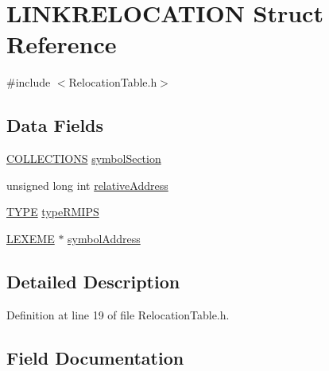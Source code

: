 \hypertarget{struct_l_i_n_k_r_e_l_o_c_a_t_i_o_n}{}\section{L\+I\+N\+K\+R\+E\+L\+O\+C\+A\+T\+I\+ON Struct Reference}
\label{struct_l_i_n_k_r_e_l_o_c_a_t_i_o_n}


{\ttfamily \#include $<$Relocation\+Table.\+h$>$}

\subsection*{Data Fields}
\begin{DoxyCompactItemize}
\item 
\mbox{\hyperlink{_f_s_m_collection_8h_a25f9142504106abec10ec63d2a9be4cd}{C\+O\+L\+L\+E\+C\+T\+I\+O\+NS}} \mbox{\hyperlink{struct_l_i_n_k_r_e_l_o_c_a_t_i_o_n_aa1eeb44bfc2ccae7106913b2bc1d7ccc}{symbol\+Section}}
\item 
unsigned long int \mbox{\hyperlink{struct_l_i_n_k_r_e_l_o_c_a_t_i_o_n_a2b4c998ebe2320c92c078f7e5e389b11}{relative\+Address}}
\item 
\mbox{\hyperlink{_relocation_table_8h_a0bc6723d5d4776ab7cdc646728b775f7}{T\+Y\+PE}} \mbox{\hyperlink{struct_l_i_n_k_r_e_l_o_c_a_t_i_o_n_a7f2b6e2148b75d2d1a211bcdcf45d96f}{type\+R\+M\+I\+PS}}
\item 
\mbox{\hyperlink{struct_l_e_x_e_m_e}{L\+E\+X\+E\+ME}} $\ast$ \mbox{\hyperlink{struct_l_i_n_k_r_e_l_o_c_a_t_i_o_n_aca543ac01363d248142f1a6f76a76023}{symbol\+Address}}
\end{DoxyCompactItemize}


\subsection{Detailed Description}


Definition at line 19 of file Relocation\+Table.\+h.



\subsection{Field Documentation}
\mbox{\label{struct_l_i_n_k_r_e_l_o_c_a_t_i_o_n_a2b4c998ebe2320c92c078f7e5e389b11}} 
